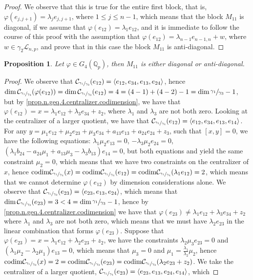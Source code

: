 \documentclass[12pt,fleqn]{article}
\newcommand*\circled[1]{\tikz[baseline=(char.base)]{
            \small \node[shape=circle,draw,inner sep=1pt] (char) {#1};}}
\newtheorem{proposition}[theorem]{Proposition}
\begin{document}
\begin{proof}
We observe that this is true for the entire first block, that is, $\varphi(e_{j,j+1})=\lambda_j e_{j,j+1}$, where $1\leq j\leq n-1$, which means that the block $M_{11}$ is diagonal, if we assume that $\varphi(e_{12})=\lambda_1 e_{12}$, and it is immediate to follow the course of this proof with the assumption that $\varphi(e_{12})=\lambda_{n-1}e_{n-1,n}+w$, where $w\in\gamma_2\mathcal{L}_{n,p}$, and prove that in this case the block $M_{11}$ is anti-diagonal.
\end{proof}
\begin{proposition}
\label{m11.n.4}
Let $\varphi\in G_4(\mathbb{Q}_p)$, then $M_{11}$ is either diagonal or anti-diagonal.
\end{proposition}
\begin{proof}
We observe that $\mathcal{C}_{\sfrac{\gamma_1}{\gamma_3}}(e_{12})=\langle e_{12},e_{34},e_{13},e_{24}\rangle$, hence $\dim\mathcal{C}_{\sfrac{\gamma_1}{\gamma_3}}(\varphi(e_{12}))=\dim\mathcal{C}_{\sfrac{\gamma_1}{\gamma_3}}(e_{12})=4=(4-1)+(4-2)-1=\dim\sfrac{\gamma_1}{\gamma_3}-1$, but by \ref{prop.n.geq.4.centralizer.codimension}, we have that $\varphi(e_{12})=x=\lambda_1 e_{12}+\lambda_3 e_{34}+z_2$, where $\lambda_1$ and $\lambda_3$ are not both zero. Looking at the centralizer of a larger quotient, we have that $\mathcal{C}_{\sfrac{\gamma_1}{\gamma_4}}(e_{12})=\langle e_{12},e_{34},e_{13},e_{14}\rangle$. For any $y=\mu_1 e_{12}+\mu_2 e_{23}+\mu_3 e_{34}+a_{13}e_{13}+a_{24}e_{24}+z_3$, such that $[x,y]=0$, we have the following equations: \circled{1} $\lambda_1\mu_2 e_{13}=0$, \circled{2} $-\lambda_3\mu_2 e_{24}=0$, \circled{3} $(\lambda_1 b_{24}-a_{24}\mu_1+a_{13}\mu_3-\lambda_3 b_{13})e_{14}=0$, but both equations \circled{1} and \circled{2} yield the same constraint $\mu_2=0$, which means that we have two constraints on the centralizer of $x$, hence $\mathrm{codim}\mathcal{C}_{\sfrac{\gamma_1}{\gamma_4}}(x)=\mathrm{codim}\mathcal{C}_{\sfrac{\gamma_1}{\gamma_4}}(e_{12})=\mathrm{codim}\mathcal{C}_{\sfrac{\gamma_1}{\gamma_4}}(\lambda_1 e_{12})=2$, which means that we cannot determine $\varphi(e_{12})$ by dimension considerations alone. We observe that $\mathcal{C}_{\sfrac{\gamma_1}{\gamma_3}}(e_{23})=\langle e_{23},e_{13},e_{24}\rangle$, which means that $\dim\mathcal{C}_{\sfrac{\gamma_1}{\gamma_3}}(e_{23})=3<4=\dim\sfrac{\gamma_1}{\gamma_3}-1$, hence by \ref{prop.n.geq.4.centralizer.codimension} we have that $\varphi(e_{23})\neq\lambda_1 e_{12}+\lambda_3 e_{34}+z_2$ where $\lambda_1$ and $\lambda_3$ are not both zero, which means that we must have $\lambda_2 e_{23}$ in the linear combination that forms $\varphi(e_{23})$. Suppose that $\varphi(e_{23})=x=\lambda_1 e_{12}+\lambda_2 e_{23}+z_2$, we have the constraints \circled{1} $\lambda_2\mu_3 e_{23}=0$ and \circled{2} $(\lambda_1\mu_2-\lambda_2\mu_1)e_{13}=0$, which means that $\mu_3=0$ and $\mu_1=\frac{\lambda_1}{\lambda_2}\mu_2$, hence $\mathrm{codim}\mathcal{C}_{\sfrac{\gamma_1}{\gamma_3}}(x)=2=\mathrm{codim}\mathcal{C}_{\sfrac{\gamma_1}{\gamma_3}}(e_{23})=\mathrm{codim}\mathcal{C}_{\sfrac{\gamma_1}{\gamma_3}}(\lambda_2 e_{23}+z_2)$. We take the centralizer of a larger quotient, $\mathcal{C}_{\sfrac{\gamma_1}{\gamma_4}}(e_{23})=\langle e_{23},e_{13},e_{24},e_{14}\rangle$, which 
\end{proof}
\end{document}
